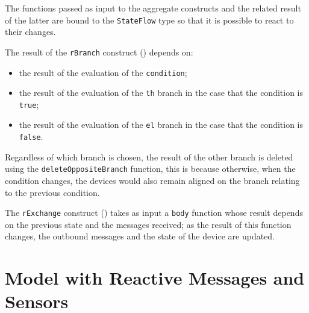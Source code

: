 The functions passed as input to the aggregate constructs and the related result of the latter are bound to the \texttt{StateFlow} type so that it is possible to react to their changes.

The result of the \texttt{rBranch} construct () depends on:
\begin{itemize}
    \item the result of the evaluation of the \texttt{condition};
    \item the result of the evaluation of the \texttt{th} branch in the case that the condition is \texttt{true};
    \item the result of the evaluation of the \texttt{el} branch in the case that the condition is \texttt{false}.
\end{itemize}

Regardless of which branch is chosen, the result of the other branch is deleted using the \texttt{deleteOppositeBranch} function, this is because otherwise, when the condition changes, the devices would also remain aligned on the branch relating to the previous condition.

The \texttt{rExchange} construct () takes as input a \texttt{body} function whose result depends on the previous state and the messages received; as the result of this function changes, the outbound messages and the state of the device are updated.









\section{Model with Reactive Messages and Sensors}

